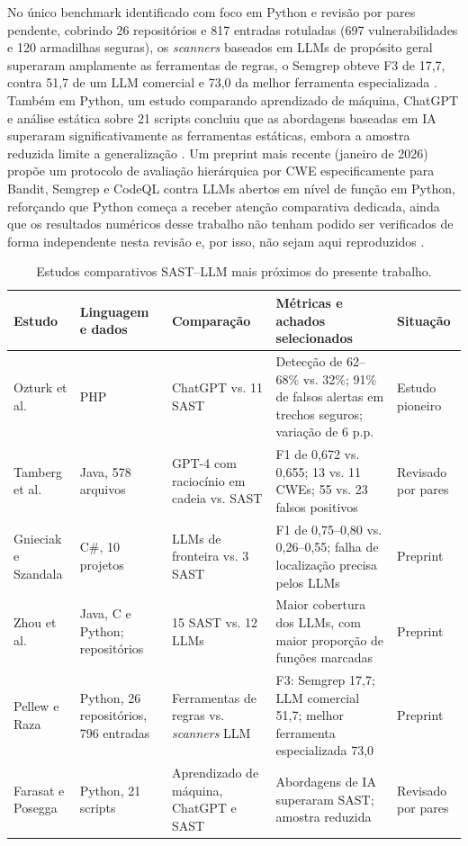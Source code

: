 No único benchmark identificado com foco em Python e revisão por pares pendente, cobrindo 26 repositórios e 817 entradas rotuladas (697 vulnerabilidades e 120 armadilhas seguras), os \textit{scanners} baseados em LLMs de propósito geral superaram amplamente as ferramentas de regras, o Semgrep obteve F3 de 17,7, contra 51,7 de um LLM comercial e 73,0 da melhor ferramenta especializada \cite{Pellew2026RealVuln}. Também em Python, um estudo comparando aprendizado de máquina, ChatGPT e análise estática sobre 21 scripts concluiu que as abordagens baseadas em IA superaram significativamente as ferramentas estáticas, embora a amostra reduzida limite a generalização \cite{Farasat2025PythonSecurity}. Um preprint mais recente (janeiro de 2026) propõe um protocolo de avaliação hierárquica por CWE especificamente para Bandit, Semgrep e CodeQL contra LLMs abertos em nível de função em Python, reforçando que Python começa a receber atenção comparativa dedicada, ainda que os resultados numéricos desse trabalho não tenham podido ser verificados de forma independente nesta revisão e, por isso, não sejam aqui reproduzidos \cite{Adnan2026ALPHA}.


\begin{table}[htbp]
\centering
\caption{Estudos comparativos SAST–LLM mais próximos do presente trabalho.}\label{tab:compartivos-sast-llm}
\begin{tabularx}{\textwidth}{|X|X|X|X|X|}
\hline
\textbf{Estudo} & \textbf{Linguagem e dados} & \textbf{Comparação} & \textbf{Métricas e achados selecionados} & \textbf{Situação} \\
\hline
Ozturk et al. \cite{Ozturk2023AIvsSAST} & PHP & ChatGPT vs. 11 SAST & Detecção de 62–68\% vs. 32\%; 91\% de falsos alertas em trechos seguros; variação de 6 p.p. & Estudo pioneiro \\
\hline
Tamberg et al. \cite{Tamberg2025LLMHarness} & Java, 578 arquivos & GPT-4 com raciocínio em cadeia vs. SAST & F1 de 0,672 vs. 0,655; 13 vs. 11 CWEs; 55 vs. 23 falsos positivos & Revisado por pares \\
\hline
Gnieciak e Szandala \cite{Gnieciak2025LLMvsSAST} & C\#, 10 projetos & LLMs de fronteira vs. 3 SAST & F1 de 0,75–0,80 vs. 0,26–0,55; falha de localização precisa pelos LLMs & Preprint \\
\hline
Zhou et al. \cite{Zhou2024SASTLLMRepo} & Java, C e Python; repositórios & 15 SAST vs. 12 LLMs & Maior cobertura dos LLMs, com maior proporção de funções marcadas & Preprint \\
\hline
Pellew e Raza \cite{Pellew2026RealVuln} & Python, 26 repositórios, 796 entradas & Ferramentas de regras vs. \textit{scanners} LLM & F3: Semgrep 17,7; LLM comercial 51,7; melhor ferramenta especializada 73,0 & Preprint \\
\hline
Farasat e Posegga \cite{Farasat2025PythonSecurity} & Python, 21 scripts & Aprendizado de máquina, ChatGPT e SAST & Abordagens de IA superaram SAST; amostra reduzida & Revisado por pares \\
\hline
\end{tabularx}
\end{table}

